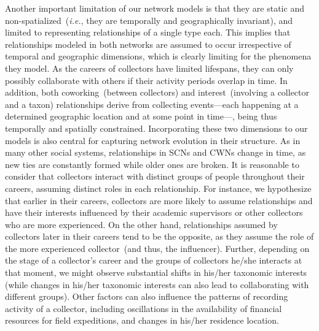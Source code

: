 Another important limitation of our network models is that they are static and non-spatialized~(\textit{i.e.}, they are temporally and geographically invariant), and limited to representing relationships of a single type each. This implies that relationships modeled in both networks are assumed to occur irrespective of temporal and geographic dimensions, which is clearly limiting for the phenomena they model.
As the careers of collectors have limited lifespans, they can only possibly collaborate with others if their activity periods overlap in time.
In addition, both coworking~(between collectors) and interest~(involving a collector and a taxon) relationships derive from collecting events---each happening at a determined geographic location and at some point in time---, being thus temporally and spatially constrained.
Incorporating these two dimensions to our models is also central for capturing network evolution in their structure.
%
As in many other social systems, relationships in SCNs and CWNs change in time, as new ties are constantly formed while older ones are broken.
It is reasonable to consider that collectors interact with distinct groups of people throughout their careers, assuming distinct roles in each relationship.
For instance, we hypothesize that earlier in their careers, collectors are more likely to assume relationships and have their interests influenced by their academic supervisors or other collectors who are more experienced.
On the other hand, relationships assumed by collectors later in their careers tend to be the opposite, as they assume the role of the more experienced collector~(and thus, the influencer).
Further, depending on the stage of a collector's career and the groups of collectors he/she interacts at that moment, we might observe substantial shifts in his/her taxonomic interests (while changes in his/her taxonomic interests can also lead to collaborating with different groups).
Other factors can also influence the patterns of recording activity of a collector, including oscillations in the availability of financial resources for field expeditions, and changes in his/her residence location.

